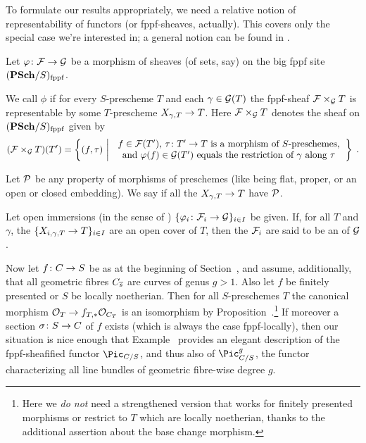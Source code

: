 \documentclass[a4paper,parskip=half,numbers=enddot, DIV=12]{scrreprt}
\begin{document}
To formulate our results appropriately, we need a relative notion of representability of functors (or fppf-sheaves, actually). This covers only the special case we're interested in; a general notion can be found in \cite[]{stacks-project}.
\begin{defi}
	Let $\phi\colon\Ff\morphism\Gg$ be a morphism of sheaves (of sets, say) on the big fppf site $(\cat{PSch}/S)_\fppf$.
	\begin{alphanumerate}
		\item We call $\phi$  if for every $S$-prescheme $T$ and each $\gamma\in\mathcal{G}(T)$ the fppf-sheaf $\mathcal{F}\times_{\mathcal{G}} T$ is representable by some $T$-prescheme $X_{\gamma,T}\morphism T$. Here $\mathcal{F}\times_{\mathcal{G}} T$ denotes the sheaf on $(\cat{PSch}/S)_\fppf$ given by
		\begin{align*}
			(\Ff\times_\Gg T)(T')=\left\{(f,\tau)\st
		\begin{tabular}{c}
			$f\in \Ff(T')$, $\tau\colon T'\morphism T$ is a morphism of $S$-preschemes,\\
			 and $\phi(f)\in\Gg(T')$ equals the restriction of $\gamma$ along $\tau$
		\end{tabular}\right\}\;.
		\end{align*}
		\item Let $\mathcal{P}$ be any property of morphisms of preschemes (like being flat, proper, or an open or closed embedding). We say  if all the $X_{\gamma,T}\morphism T$ have $\mathcal{P}$.
		\item Let open immersions (in the sense of ) $\{\phi_i\colon \Ff_i\morphism \Gg\}_{i\in I}$ be given. If, for all $T$ and $\gamma$, the $\{X_{i,\gamma,T}\morphism T\}_{i\in I}$ are an open cover of $T$, then the $\mathcal{F}_i$ are said to be an  of $\mathcal{G}$.
	\end{alphanumerate}
\end{defi}
Now let $f\colon C\morphism S$ be as at the beginning of Section~, and assume, additionally, that all geometric fibres $C_{\overline{s}}$ are curves of genus $g>1$. Also let $f$ be finitely presented or $S$ be locally noetherian. Then for all $S$-preschemes $T$ the canonical morphism $\Oo_T\morphism f_{T,*}\Oo_{C_T}$ is an isomorphism by Proposition~.\footnote{Here we \emph{do not} need a strengthened version that works for finitely presented morphisms or restrict to $T$ which are locally noetherian, thanks to the additional assertion about the base change morphism.} If moreover a section $\sigma\colon S\morphism C$ of $f$ exists (which is always the case fppf-locally), then our situation is nice enough that Example~ provides an elegant description of the fppf-sheafified functor $\Pic_{C/S}$, and thus also of $\Pic_{C/S}^g$, the functor characterizing all line bundles of geometric fibre-wise degree $g$.
\end{document}
